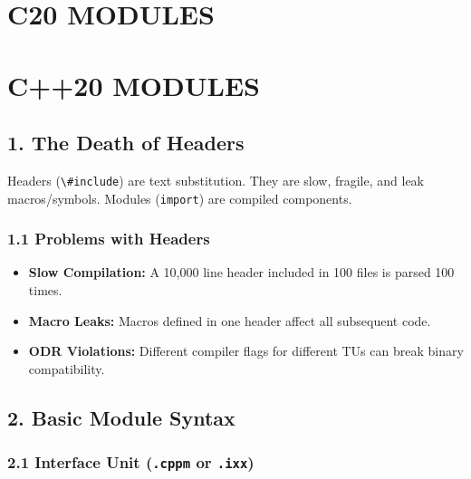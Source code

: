 \hypertarget{c20-modules}{%
\chapter{C20 MODULES}\label{c20-modules}}

\hypertarget{c20-modules-1}{%
\chapter{C++20 MODULES}\label{c20-modules-1}}

\hypertarget{the-death-of-headers}{%
\section{1. The Death of Headers}\label{the-death-of-headers}}

Headers (\passthrough{\lstinline!\#include!}) are text substitution.
They are slow, fragile, and leak macros/symbols. Modules
(\passthrough{\lstinline!import!}) are compiled components.

\hypertarget{problems-with-headers}{%
\subsection{1.1 Problems with Headers}\label{problems-with-headers}}

\begin{itemize}
\tightlist
\item
  \textbf{Slow Compilation:} A 10,000 line header included in 100 files
  is parsed 100 times.
\item
  \textbf{Macro Leaks:} Macros defined in one header affect all
  subsequent code.
\item
  \textbf{ODR Violations:} Different compiler flags for different TUs
  can break binary compatibility.
\end{itemize}

\hypertarget{basic-module-syntax}{%
\section{2. Basic Module Syntax}\label{basic-module-syntax}}

\hypertarget{interface-unit-.cppm-or-.ixx}{%
\subsection{\texorpdfstring{2.1 Interface Unit (\texttt{.cppm} or
\texttt{.ixx})}{2.1 Interface Unit (.cppm or .ixx)}}\label{interface-unit-.cppm-or-.ixx}}


